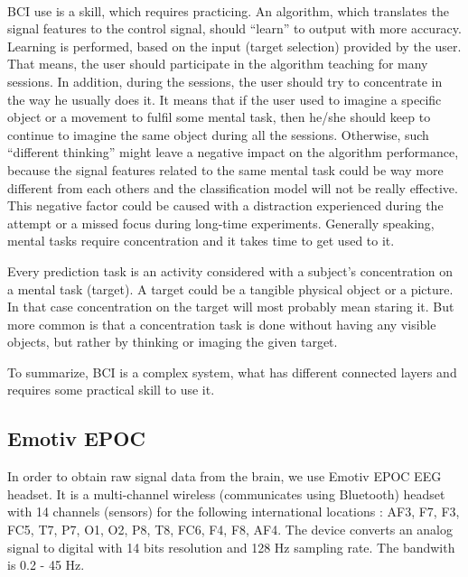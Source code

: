 \documentclass[12pt]{article}
\theoremstyle{definition}
\begin{document}
\paragraph{}
BCI use is a skill, which requires practicing. An algorithm, which translates the signal features to the control signal, should ``learn'' to output with more accuracy. Learning is performed, based on the input (target selection) provided by the user. That means, the user should participate in the algorithm teaching for many sessions. In addition, during the sessions, the user should try to concentrate in the way he usually does it. It means that if the user used to imagine a specific object or a movement to fulfil some mental task, then he/she should keep to continue to imagine the same object during all the sessions. Otherwise, such ``different thinking'' might leave a negative impact on the algorithm performance, because the signal features related to the same mental task could be way more different from each others and the classification model will not be really effective. This negative factor could be caused with a distraction experienced during the attempt or a missed focus during long-time experiments. Generally speaking, mental tasks require concentration and it takes time to get used to it.

Every prediction task is an activity considered with a subject's concentration on a mental task (target). A target could be a tangible physical object or a picture. In that case concentration on the target will most probably mean staring it. But more common is that a concentration task is done without having any visible objects, but rather by thinking or imaging the given target.

To summarize, BCI is a complex system, what has different connected layers and requires some practical skill to use it.
\subsection{Emotiv EPOC}

In order to obtain raw signal data from the brain, we use Emotiv EPOC EEG headset. It is a multi-channel wireless (communicates using Bluetooth) headset with 14 channels (sensors) for the following international locations \cite{emotiv}: AF3, F7, F3, FC5, T7, P7, O1, O2, P8, T8, FC6, F4, F8, AF4. The device converts an analog signal to digital with 14 bits resolution and 128 Hz sampling rate. The bandwith is 0.2 - 45 Hz. \cite{emotiv}
\end{document}
